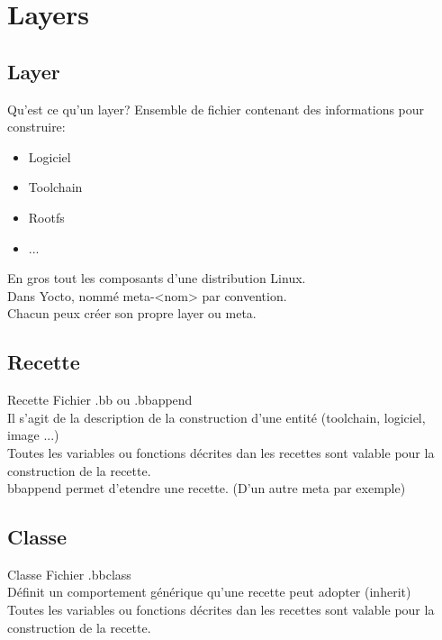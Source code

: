 \section{Layers}

\subsection{Layer}
\begin{frame}{Qu'est ce qu'un layer?}{}
	Ensemble de fichier contenant des informations pour construire:
	\begin{itemize}
		\item
			Logiciel
		\item
			Toolchain
		\item
			Rootfs
		\item
			...
	\end{itemize}
	En gros tout les composants d'une distribution Linux.\\
	Dans Yocto, nommé meta-<nom> par convention.\\
	Chacun peux créer son propre layer ou meta.\\
\end{frame}

\subsection{Recette}
\begin{frame}{Recette}{}
	Fichier .bb ou .bbappend\\
	Il s'agit de la description de la construction d'une entité (toolchain, logiciel, image ...)\\
	Toutes les variables ou fonctions décrites dan les recettes sont valable pour la construction de la recette.\\
	bbappend permet d'etendre une recette. (D'un autre meta par exemple)\\
\end{frame}

\subsection{Classe}
\begin{frame}{Classe}{}
	Fichier .bbclass\\
	Définit un comportement générique qu'une recette peut adopter (inherit)\\
	Toutes les variables ou fonctions décrites dan les recettes sont valable pour la construction de la recette.\\
\end{frame}


